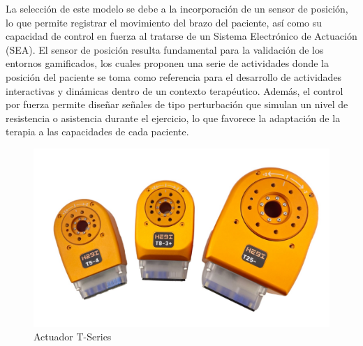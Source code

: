 La selección de este modelo se debe a la incorporación de un sensor de posición, lo que permite registrar el movimiento del brazo del paciente, así como su capacidad de control en fuerza al tratarse de un Sistema Electrónico de Actuación (SEA).
El sensor de posición resulta fundamental para la validación de los entornos gamificados, los cuales proponen una serie de actividades donde la posición del paciente se toma como referencia para el desarrollo de actividades interactivas y dinámicas dentro de un contexto terapéutico.
Además, el control por fuerza permite diseñar señales de tipo perturbación que simulan un nivel de resistencia o asistencia durante el ejercicio, lo que favorece la adaptación de la terapia a las capacidades de cada paciente.

\begin{figure}[ht!]
	\centering
	\begin{minipage}{0.45\linewidth}
		\centering
		\includegraphics[width=\linewidth]{figs/actuador_T-Series.jpg}
	\end{minipage}
	\caption[Actuador T-Series]{Actuador T-Series}
	\label{fig:actuador}
\end{figure}
